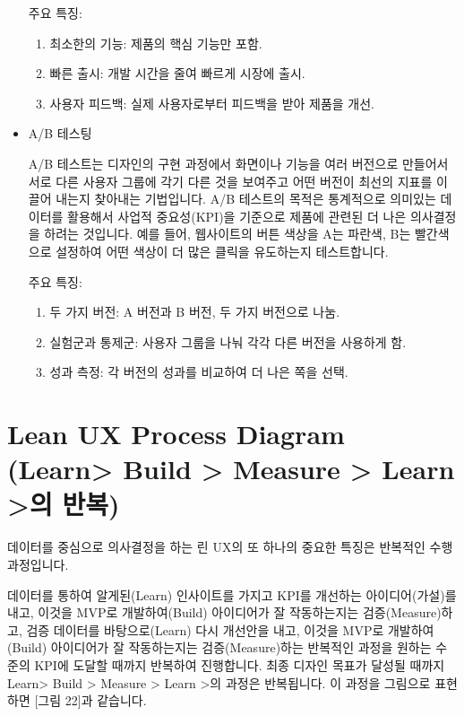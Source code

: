 \documentclass[
  letterpaper,
]{book}
\providecommand{\tightlist}{%
  \setlength{\itemsep}{0pt}\setlength{\parskip}{0pt}}\usepackage{longtable,booktabs,array}
\begin{document}
\begin{itemize}
  주요 특징:

  \begin{enumerate}
  \def\labelenumi{\arabic{enumi}.}
  \tightlist
  \item
    최소한의 기능: 제품의 핵심 기능만 포함.
  \item
    빠른 출시: 개발 시간을 줄여 빠르게 시장에 출시.
  \item
    사용자 피드백: 실제 사용자로부터 피드백을 받아 제품을 개선.
  \end{enumerate}
\item
  A/B 테스팅

  A/B 테스트는 디자인의 구현 과정에서 화면이나 기능을 여러 버전으로
  만들어서 서로 다른 사용자 그룹에 각기 다른 것을 보여주고 어떤 버전이
  최선의 지표를 이끌어 내는지 찾아내는 기법입니다. A/B 테스트의 목적은
  통계적으로 의미있는 데이터를 활용해서 사업적 중요성(KPI)을 기준으로
  제품에 관련된 더 나은 의사결정을 하려는 것입니다. 예를 들어,
  웹사이트의 버튼 색상을 A는 파란색, B는 빨간색으로 설정하여 어떤 색상이
  더 많은 클릭을 유도하는지 테스트합니다.

  주요 특징:

  \begin{enumerate}
  \def\labelenumi{\arabic{enumi}.}
  \tightlist
  \item
    두 가지 버전: A 버전과 B 버전, 두 가지 버전으로 나눔.
  \item
    실험군과 통제군: 사용자 그룹을 나눠 각각 다른 버전을 사용하게 함.
  \item
    성과 측정: 각 버전의 성과를 비교하여 더 나은 쪽을 선택.
  \end{enumerate}
\end{itemize}

\section{Lean UX Process Diagram (Learn\textgreater{} Build
\textgreater{} Measure \textgreater{} Learn \textgreater 의
반복)}\label{lean-ux-process-diagram-learn-build-measure-learn-uxc758-uxbc18uxbcf5}

데이터를 중심으로 의사결정을 하는 린 UX의 또 하나의 중요한 특징은
반복적인 수행 과정입니다.

데이터를 통하여 알게된(Learn) 인사이트를 가지고 KPI를 개선하는
아이디어(가설)를 내고, 이것을 MVP로 개발하여(Build) 아이디어가 잘
작동하는지는 검증(Measure)하고, 검증 데이터를 바탕으로(Learn) 다시
개선안을 내고, 이것을 MVP로 개발하여(Build) 아이디어가 잘 작동하는지는
검증(Measure)하는 반복적인 과정을 원하는 수준의 KPI에 도달할 때까지
반복하여 진행합니다. 최종 디자인 목표가 달성될 때까지
Learn\textgreater{} Build \textgreater{} Measure \textgreater{} Learn
\textgreater 의 과정은 반복됩니다. 이 과정을 그림으로 표현하면 {[}그림
22{]}과 같습니다.
\end{document}
